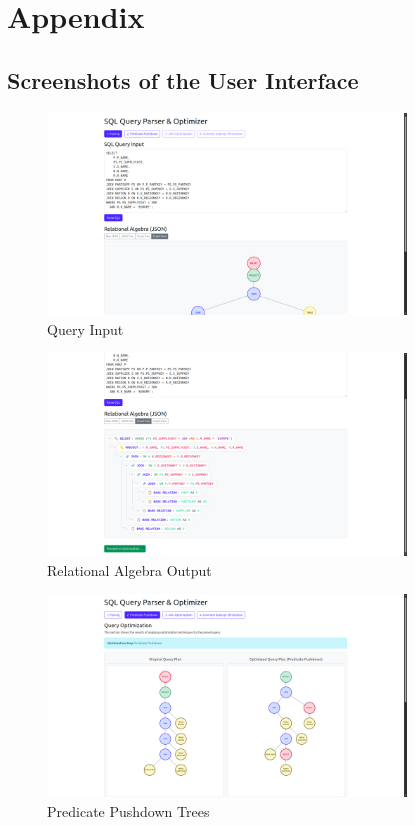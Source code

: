\documentclass[12pt]{article}
\begin{document}
\appendix

\section*{Appendix}

\subsection*{Screenshots of the User Interface}

\begin{figure}[H]
    \centering
    \includegraphics[width=0.85\textwidth]{images/ss1.png}
    \caption{Query Input}
\end{figure}

\begin{figure}[H]
    \centering
    \includegraphics[width=0.85\textwidth]{images/ss2.png}
    \caption{Relational Algebra Output}
\end{figure}

\begin{figure}[H]
    \centering
    \includegraphics[width=0.85\textwidth]{images/ss3.png}
    \caption{Predicate Pushdown Trees}
\end{figure}
\end{document}
